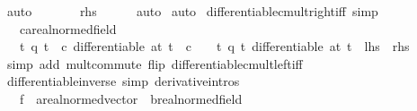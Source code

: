 \begin{isabellebody}
\ auto\isanewline
\ \ \isacommand{{\isacharbraceright}{\kern0pt}}\isamarkupfalse%
\ \isamarkupfalse%
\ \isamarkupfalse%
\ {\isacharquery}{\kern0pt}rhs\isanewline
\ \ \ \ \isamarkupfalse%
\ auto\isanewline
{}\isamarkupfalse%
\ auto%
\endisatagproof
{\isafoldproof}%
%
\isadelimproof
\isanewline
%
\endisadelimproof
\isanewline
{}\isamarkupfalse%
\ differentiable{\isacharunderscore}{\kern0pt}cmult{\isacharunderscore}{\kern0pt}right{\isacharunderscore}{\kern0pt}iff\ {\isacharbrackleft}{\kern0pt}simp{\isacharbrackright}{\kern0pt}{\isacharcolon}{\kern0pt}\isanewline
\ \ \ c{\isacharcolon}{\kern0pt}{\isacharcolon}{\kern0pt}{\isachardoublequoteopen}{\isacharprime}{\kern0pt}a{\isacharcolon}{\kern0pt}{\isacharcolon}{\kern0pt}real{\isacharunderscore}{\kern0pt}normed{\isacharunderscore}{\kern0pt}field{\isachardoublequoteclose}\ \isanewline
\ \ \ {\isachardoublequoteopen}{\isacharparenleft}{\kern0pt}{\isasymlambda}t{\isachardot}{\kern0pt}\ q\ t\ {\isacharasterisk}{\kern0pt}\ c{\isacharparenright}{\kern0pt}\ differentiable\ at\ t\ {\isasymlongleftrightarrow}\ c\ {\isacharequal}{\kern0pt}\ {}\ {\isasymor}\ {\isacharparenleft}{\kern0pt}{\isasymlambda}t{\isachardot}{\kern0pt}\ q\ t{\isacharparenright}{\kern0pt}\ differentiable\ at\ t{\isachardoublequoteclose}\ {\isacharparenleft}{\kern0pt}\ {\isachardoublequoteopen}{\isacharquery}{\kern0pt}lhs\ {\isacharequal}{\kern0pt}\ {\isacharquery}{\kern0pt}rhs{\isachardoublequoteclose}{\isacharparenright}{\kern0pt}\isanewline
%
\isadelimproof
\ \ %
\endisadelimproof
%
\isatagproof
{}\isamarkupfalse%
\ {\isacharparenleft}{\kern0pt}simp\ add{\isacharcolon}{\kern0pt}\ mult{\isachardot}{\kern0pt}commute\ flip{\isacharcolon}{\kern0pt}\ differentiable{\isacharunderscore}{\kern0pt}cmult{\isacharunderscore}{\kern0pt}left{\isacharunderscore}{\kern0pt}iff{\isacharparenright}{\kern0pt}%
\endisatagproof
{\isafoldproof}%
%
\isadelimproof
\isanewline
%
\endisadelimproof
\isanewline
{}\isamarkupfalse%
\ differentiable{\isacharunderscore}{\kern0pt}inverse\ {\isacharbrackleft}{\kern0pt}simp{\isacharcomma}{\kern0pt}\ derivative{\isacharunderscore}{\kern0pt}intros{\isacharbrackright}{\kern0pt}{\isacharcolon}{\kern0pt}\isanewline
\ \ \ f\ {\isacharcolon}{\kern0pt}{\isacharcolon}{\kern0pt}\ {\isachardoublequoteopen}{\isacharprime}{\kern0pt}a{\isacharcolon}{\kern0pt}{\isacharcolon}{\kern0pt}real{\isacharunderscore}{\kern0pt}normed{\isacharunderscore}{\kern0pt}vector\ {\isasymRightarrow}\ {\isacharprime}{\kern0pt}b{\isacharcolon}{\kern0pt}{\isacharcolon}{\kern0pt}real{\isacharunderscore}{\kern0pt}normed{\isacharunderscore}{\kern0pt}field{\isachardoublequoteclose}\isanewline

\end{isabellebody}
